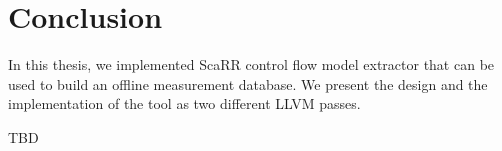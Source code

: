 
\chapter{Conclusion} %

\label{Chapter7} %

In this thesis, we implemented ScaRR control flow model extractor that can be
used to build an offline measurement database. We present the design and the
implementation of the tool as two different LLVM passes.

TBD